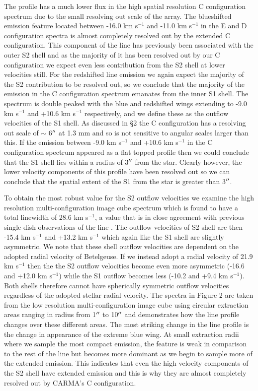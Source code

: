 \documentclass[preprint2]{aastex}
\begin{document}
The profile has a much lower flux in the high spatial resolution C configuration spectrum due to the small resolving out scale of the array. The blueshifted emission feature located between -16.0 km s${}^{-1}$ and -11.0 km s${}^{-1}$ in the E and D configuration spectra is almost completely resolved out by the extended C configuration. This component of the line has previously been associated with the outer S2 shell \citep{1987ApJ...313..400H} and as the majority of it has been resolved out by our C configuration we expect even less contribution from the S2 shell at lower velocities still. For the redshifted line emission we again expect the majority of the S2 contribution to be resolved out, so we conclude that the majority of the emission in the C configuration spectrum emanates from the inner S1 shell. The spectrum is double peaked with the blue and redshifted wings extending to -9.0 km s${}^{-1}$ and +10.6 km s${}^{-1}$ respectively, and we define these as the outflow velocities of the S1 shell. As discussed in \S2 the C configuration has a resolving out scale of $\sim$ 6$\mbox{$^{\prime\prime}$}$ at 1.3 mm and so is not sensitive to angular scales larger than this. If the emission between -9.0 km s${}^{-1}$ and +10.6 km s${}^{-1}$ in the C configuration spectrum appeared as a flat topped profile then we could conclude that the S1 shell lies within a radius of 3$\mbox{$^{\prime\prime}$}$ from the star. Clearly however, the lower velocity components of this profile have been resolved out so we can conclude that the spatial extent of the S1 from the star is greater than 3$\mbox{$^{\prime\prime}$}$. 

To obtain the most robust value for the S2 outflow velocities we examine the high resolution multi-configuration image cube spectrum which is found to have a total linewidth of 28.6 km s${}^{-1}$, a value that is in close agreement with previous single dish observations of the line \citep{1980ApJ...242L..25K, 1987ApJ...313..400H, 1994ApJ...424L.127H}. The outflow velocities of S2 shell are then -15.4 km s${}^{-1}$ and +13.2 km s${}^{-1}$ which again like the S1 shell are slightly asymmetric. We note that these shell outflow velocities are dependent on the adopted radial velocity of Betelgeuse. If we instead adopt a radial velocity of 21.9 km s${}^{-1}$ \citep{2005A&A...430..165F} then the the S2 outflow velocities become even more asymmetric (-16.6 and +12.0 km s${}^{-1}$) while the S1 outflow becomes less (-10.2 and +9.4 km s${}^{-1}$). Both shells therefore cannot have spherically symmetric outflow velocities regardless of the adopted stellar radial velocity. The spectra in Figure 2 are taken from the low resolution multi-configuration image cube using circular extraction areas ranging in radius from 1$\mbox{$^{\prime\prime}$}$ to 10$\mbox{$^{\prime\prime}$}$ and demonstrates how the line profile changes over these different areas. The most striking change in the line profile is the change in appearance of the extreme blue wing. At small extraction radii where we sample the most compact emission, the feature is weak in comparison to the rest of the line but becomes more dominant as we begin to sample more of the extended emission. This indicates that even the high velocity components of the S2 shell have extended emission and this is why they are almost completely resolved out by CARMA's C configuration.
\end{document}

